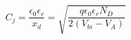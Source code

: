 \[ C_j = \dfrac{\epsilon_0 \epsilon_r}{x_d} = \sqrt{\dfrac{q \epsilon_0 \epsilon_r N_D}{2 (V_{bi} - V_A)}} \]


\newpage























